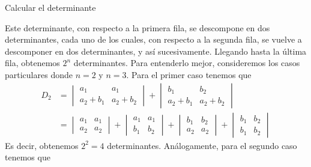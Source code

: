 \begin{examplebox}{}{}
    Calcular el determinante
    \begin{matrizn}
    \end{matrizn}

    \tcblower
    \solucion Este determinante, con respecto a la primera fila, se descompone en dos determinantes, cada uno de los cuales, con respecto a la segunda fila, se vuelve a descomponer en dos determinantes, y así sucesivamente. Llegando hasta la última fila, obtenemos $2^n$ determinantes. Para entenderlo mejor, consideremos los casos particulares donde $n = 2$ y $n = 3$. Para el primer caso tenemos que
    \begin{align*}
        D_2 & = \begin{vmatrix}
            a_1 & a_1 \\
            a_2 + b_1 & a_2 + b_2
        \end{vmatrix} + \begin{vmatrix}
            b_1 & b_2 \\
            a_2 + b_1 & a_2 + b_2
        \end{vmatrix} \\
        & = \begin{vmatrix}
            a_1 & a_1 \\
            a_2 & a_2
        \end{vmatrix} + \begin{vmatrix}
            a_1 & a_1 \\
            b_1 & b_2
        \end{vmatrix} + \begin{vmatrix}
            b_1 & b_2 \\
            a_2 & a_2
        \end{vmatrix} + \begin{vmatrix}
            b_1 & b_2 \\
            b_1 & b_2
        \end{vmatrix}
    \end{align*}
    Es decir, obtenemos $2^2 = 4$ determinantes. Análogamente, para el segundo caso tenemos que
    \begin{matrizn}

\end{matrizn}
\end{examplebox}
